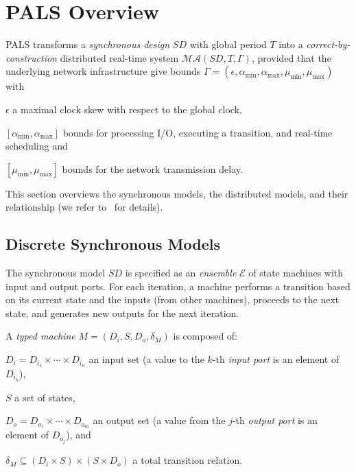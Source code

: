 
\section{PALS Overview}
\label{sec:pals}

PALS transforms 
 a \emph{synchronous design} $\mathit{SD}$ with global period $T$
into a \emph{correct-by-construction} 
distributed real-time system $\mathcal{MA}(\mathit{SD}, T, \Gamma)$,
provided that the underlying network infrastructure give bounds %
$\Gamma = (\epsilon, \alpha_{\min}, \alpha_{\max}, \mu_{\min}, \mu_{\max})$
with
%
\begin{inparaenum}[(i)]
	\item $\epsilon$ a maximal clock skew  with respect to the global clock,
	\item $[\alpha_{\min},\alpha_{\max}]$  bounds for processing I/O, 
	executing a transition, and real-time scheduling
	and
	\item $[\mu_{\min}, \mu_{\max}]$ bounds  for the network transmission delay.
\end{inparaenum}
This section overviews the synchronous models, %
the distributed  models, %
 and their relationship %
(we refer to~\cite{mr-pals-journal,pals-tcs} for details).


\subsection{Discrete Synchronous Models}

The synchronous model $\mathit{SD}$ is specified  as 
an \emph{ensemble}
$\mathcal{E}$  of %
state machines with input and output ports.
For each iteration, a machine performs a transition
based on its current state and the inputs (from other machines), %
 proceeds to the next state, and generates new outputs for the next iteration.


\begin{definition}
A  \emph{typed machine}  $M = (D_i,S,D_o,\delta_M)$
is composed of:
%
\begin{inparaenum}[(i)]
	\item $D_i = D_{i_1} \times \cdots \times D_{i_n}$ an input set 
	(a value to the $k$-th \emph{input port}  is an element of  $D_{i_k}$), 
	\item $S$ a set of states, 
	\item $D_o =D_{o_1} \times \cdots \times D_{o_m}$ an output set
	(a value from the $j$-th \emph{output port} is an element of  $D_{o_j}$), and 
	\item $\delta_M \subseteq (D_i \times S) \times (S \times D_o)$ a total
	transition relation.
\end{inparaenum}  
\end{definition}




